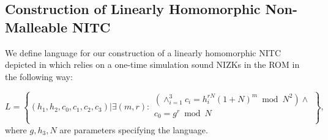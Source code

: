 \subsection{Construction of Linearly Homomorphic Non-Malleable NITC}
\label{sec:linear-ROM}
We define language for our construction of a linearly homomorphic NITC depicted in  which relies on a one-time simulation sound NIZKs in the ROM in the following way:

\[
L = \left\{(h_1, h_2, c_0, c_1, c_2, c_3)| \exists (m,r):
\begin{aligned}
       (\land_{i=1}^3 c_i = h_i^{rN}(1+N)^m \bmod N^2) \land \\
       c_0 = g^r \bmod N\\
    \end{aligned}
    \right\}, 
\]
where $g, h_3, N$ are parameters specifying the language.


